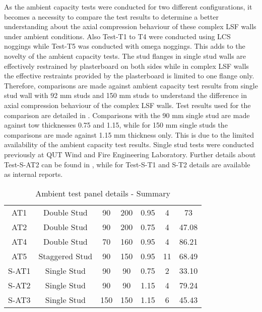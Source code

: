 As the ambient capacity tests were conducted for two different configurations, it becomes a necessity to compare the test results to determine a better understanding about the axial compression behaviour of these complex LSF walls under ambient conditions. Also Test-T1 to T4 were conducted using LCS noggings while Test-T5 was conducted with omega noggings. This adds to the novelty of the ambient capacity tests. The stud flanges in single stud walls are effectively restrained by plasterboard on both sides while in complex LSF walls the effective restraints provided by the plasterboard is limited to one flange only. Therefore, comparisons are made against ambient capacity test results from single stud wall with 92 mm studs and 150 mm studs to understand the difference in axial compression behaviour of the complex LSF walls. Test results used for the comparison are detailed in . Comparisons with the 90 mm single stud are made against tow thicknesses 0.75 and 1.15, while for 150 mm single studs the comparisons are made against 1.15 mm thickness only. This is due to the limited availability of the ambient capacity test results. Single stud tests were conducted previously at QUT Wind and Fire Engineering Laboratory. Further details about Test-S-AT2 can be found in \citet{Gunalan2013e}, while for Test-S-T1 and S-T2 details are available as internal reports. 
\begin{table}[!htbp]
	\centering
	\caption{Ambient test panel details - Summary}
	\begin{tabular}{ccccccc}
		\toprule
		\multicolumn{1}{m{2.4em}}{\centering{Test Name}} & 
		\multicolumn{1}{m{5.6em}}{\centering{Description}} & 
		\multicolumn{1}{m{2.85em}}{\centering{Stud Depth (mm)}} & 
		\multicolumn{1}{m{2.85em}}{\centering{Cavity Depth (mm)}} & 
		\multicolumn{1}{m{5em}}{\centering{Stud Thickness (mm)}} & 
		\multicolumn{1}{m{3em}}{\centering{No of Studs}} &
		\multicolumn{1}{m{3em}}{\centering{Failure Load (kN)}} \\
		\midrule
		AT1  & Double Stud & 90 & 200 & 0.95 & 4 & 73 \\
		AT2  & Double Stud & 90 & 200 & 0.75 & 4 & 47.08 \\
		AT4  & Double Stud & 70 & 160 & 0.95 & 4 & 86.21 \\
		AT5  & Staggered Stud & 90 & 150 & 0.95 & 11 & 68.49 \\
		S-AT1 & Single Stud & 90 & 90 & 0.75 & 2 & 33.10 \\
		S-AT2 & Single Stud & 90 & 90 & 1.15 & 4 & 79.24 \\
		S-AT3 & Single Stud & 150 & 150 & 1.15 & 6 & 45.43 \\
		\bottomrule
	\end{tabular}%
	\label{tab:ambient-test-results-comparison}%
\end{table}%

